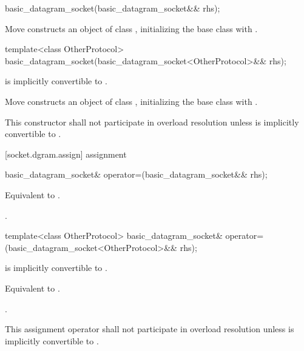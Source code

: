 \begin{itemdecl}
basic_datagram_socket(basic_datagram_socket&& rhs);
\end{itemdecl}

\begin{itemdescr}
\pnum
\effects Move constructs an object of class , initializing the base class with .
\end{itemdescr}

\begin{itemdecl}
template<class OtherProtocol>
  basic_datagram_socket(basic_datagram_socket<OtherProtocol>&& rhs);
\end{itemdecl}

\begin{itemdescr}
\pnum
\requires {} is implicitly convertible to .

\pnum
\effects Move constructs an object of class , initializing the base class with .

\pnum
\remarks This constructor shall not participate in overload resolution unless  is implicitly convertible to .
\end{itemdescr}



[socket.dgram.assign]{ assignment}

\begin{itemdecl}
basic_datagram_socket& operator=(basic_datagram_socket&& rhs);
\end{itemdecl}

\begin{itemdescr}
\pnum
\effects Equivalent to .

\pnum
\returns {}.
\end{itemdescr}

\begin{itemdecl}
template<class OtherProtocol>
  basic_datagram_socket& operator=(basic_datagram_socket<OtherProtocol>&& rhs);
\end{itemdecl}

\begin{itemdescr}
\pnum
\requires {} is implicitly convertible to .

\pnum
\effects Equivalent to .

\pnum
\returns {}.

\pnum
\remarks This assignment operator shall not participate in overload resolution unless  is implicitly convertible to .
\end{itemdescr}



